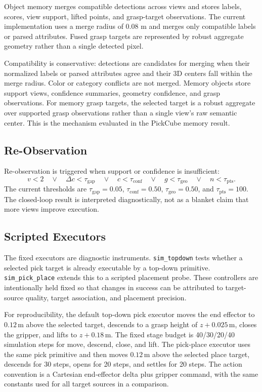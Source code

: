 \documentclass[preprint,12pt]{elsarticle}
\begin{document}
Object memory merges compatible detections across views and stores labels,
scores, view support, lifted points, and grasp-target observations. The current
implementation uses a merge radius of 0.08 m and merges only compatible labels
or parsed attributes. Fused grasp targets are represented by robust aggregate
geometry rather than a single detected pixel.

Compatibility is conservative: detections are candidates for merging when their
normalized labels or parsed attributes agree and their 3D centers fall within
the merge radius. Color or category conflicts are not merged. Memory objects
store support views, confidence summaries, geometry confidence, and grasp
observations. For memory grasp targets, the selected target is a robust
aggregate over supported grasp observations rather than a single view's raw
semantic center. This is the mechanism evaluated in the PickCube memory result.

\subsection{Re-Observation}

Re-observation is triggered when support or confidence is insufficient:
\[
v < 2 \quad \lor \quad \Delta c < \tau_{\mathrm{gap}} \quad \lor \quad
c < \tau_{\mathrm{conf}} \quad \lor \quad
g < \tau_{\mathrm{geo}} \quad \lor \quad n < \tau_{\mathrm{pts}}.
\]
The current thresholds are $\tau_{\mathrm{gap}}=0.05$,
$\tau_{\mathrm{conf}}=0.50$, $\tau_{\mathrm{geo}}=0.50$, and
$\tau_{\mathrm{pts}}=100$. The closed-loop result is interpreted
diagnostically, not as a blanket claim that more views improve execution.

\subsection{Scripted Executors}

The fixed executors are diagnostic instruments. \texttt{sim\_topdown} tests
whether a selected pick target is already executable by a top-down primitive.
\texttt{sim\_pick\_place} extends this to a scripted placement probe. These
controllers are intentionally held fixed so that changes in success can be
attributed to target-source quality, target association, and placement
precision.

For reproducibility, the default top-down pick executor moves the end effector
to \(0.12\,\mathrm{m}\) above the selected target, descends to a grasp height of
\(z+0.025\,\mathrm{m}\), closes the gripper, and lifts to \(z+0.18\,\mathrm{m}\).
The fixed stage budget is 40/30/20/40 simulation steps for move, descend,
close, and lift. The pick-place executor uses the same pick primitive and then
moves \(0.12\,\mathrm{m}\) above the selected place target, descends for 30
steps, opens for 20 steps, and settles for 20 steps. The action convention is a
Cartesian end-effector delta plus gripper command, with the same constants used
for all target sources in a comparison.
\end{document}
